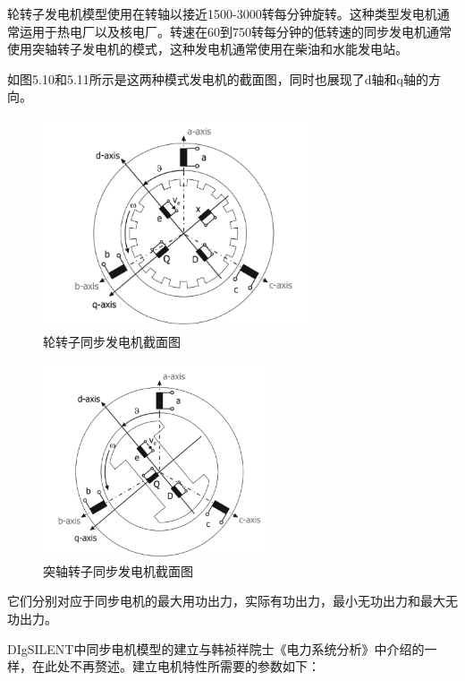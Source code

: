 轮转子发电机模型使用在转轴以接近1500-3000转每分钟旋转。这种类型发电机通常运用于热电厂以及核电厂。转速在60到750转每分钟的低转速的同步发电机通常使用突轴转子发电机的模式，这种发电机通常使用在柴油和水能发电站。

如图5.10和5.11所示是这两种模式发电机的截面图，同时也展现了d轴和q轴的方向。

\begin{figure}[H]
\centering
\includegraphics[width=0.7\textwidth]{images/Paper_Fig_26.png}
\setcaptionwidth{\linewidth}
\caption{轮转子同步发电机截面图}
\end{figure}

\begin{figure}[H]
\centering
\includegraphics[width=0.6\textwidth]{images/Paper_Fig_27.png}
\setcaptionwidth{\linewidth}
\caption{突轴转子同步发电机截面图}
\end{figure}

它们分别对应于同步电机的最大用功出力，实际有功出力，最小无功出力和最大无功出力。
 
DIgSILENT中同步电机模型的建立与韩祯祥院士《电力系统分析》中介绍的一样，在此处不再赘述。建立电机特性所需要的参数如下：


